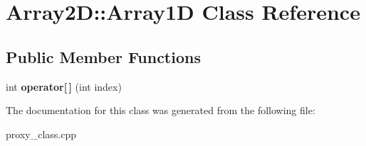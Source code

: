 \hypertarget{classArray2D_1_1Array1D}{}\section{Array2D\+:\+:Array1D Class Reference}
\label{classArray2D_1_1Array1D}
\subsection*{Public Member Functions}
\begin{DoxyCompactItemize}
\item 
int {\bfseries operator\mbox{[}$\,$\mbox{]}} (int index)\hypertarget{classArray2D_1_1Array1D_abafca2d916bbada1152d8c36a95708d6}{}\label{classArray2D_1_1Array1D_abafca2d916bbada1152d8c36a95708d6}

\end{DoxyCompactItemize}


The documentation for this class was generated from the following file\+:\begin{DoxyCompactItemize}
\item 
proxy\+\_\+class.\+cpp\end{DoxyCompactItemize}
